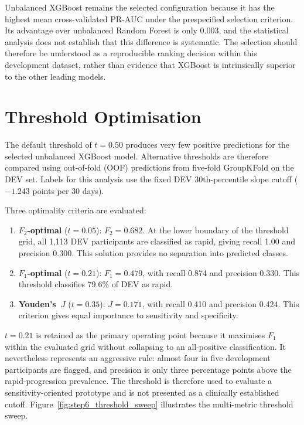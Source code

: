 Unbalanced XGBoost remains the selected configuration because it has the highest mean cross-validated PR-AUC under the prespecified selection criterion. Its advantage over unbalanced Random Forest is only 0.003, and the statistical analysis does not establish that this difference is systematic. The selection should therefore be understood as a reproducible ranking decision within this development dataset, rather than evidence that XGBoost is intrinsically superior to the other leading models.


\section{Threshold Optimisation}
\label{sec:results_threshold_xgb}

The default threshold of $t\!=\!0.50$ produces very few positive predictions for the selected unbalanced XGBoost model. Alternative thresholds are therefore compared using out-of-fold (OOF) predictions from five-fold GroupKFold on the DEV set. Labels for this analysis use the fixed DEV 30th-percentile slope cutoff ($-1.243$ points per 30 days).

Three optimality criteria are evaluated:
\begin{enumerate}
  \item \textbf{$F_2$-optimal} ($t\!=\!0.05$): $F_2=0.682$. At the lower boundary of the threshold grid, all 1,113 DEV participants are classified as rapid, giving recall 1.00 and precision 0.300. This solution provides no separation into predicted classes.
  \item \textbf{$F_1$-optimal} ($t\!=\!0.21$): $F_1=0.479$, with recall 0.874 and precision 0.330. This threshold classifies 79.6\% of DEV as rapid.
  \item \textbf{Youden's~$J$} ($t\!=\!0.35$): $J=0.171$, with recall 0.410 and precision 0.424. This criterion gives equal importance to sensitivity and specificity.
\end{enumerate}

$t=0.21$ is retained as the primary operating point because it maximises $F_1$ within the evaluated grid without collapsing to an all-positive classification. It nevertheless represents an aggressive rule: almost four in five development participants are flagged, and precision is only three percentage points above the rapid-progression prevalence. The threshold is therefore used to evaluate a sensitivity-oriented prototype and is not presented as a clinically established cutoff.
Figure~\ref{fig:step6_threshold_sweep} illustrates the multi-metric threshold sweep.

